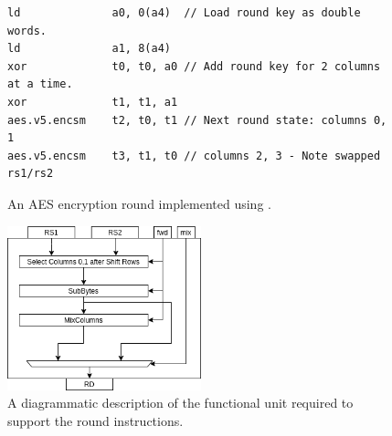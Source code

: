 \begin{figure}[!h]
\begin{lstlisting}[language=pseudo,style=block]
ld              a0, 0(a4)  // Load round key as double words.
ld              a1, 8(a4)
xor             t0, t0, a0 // Add round key for 2 columns at a time.
xor             t1, t1, a1
aes.v5.encsm    t2, t0, t1 // Next round state: columns 0, 1
aes.v5.encsm    t3, t1, t0 // columns 2, 3 - Note swapped rs1/rs2
\end{lstlisting}
\caption{
  An AES encryption round implemented using .
}
\label{fig:v4:round}
\end{figure}

\vspace*{\fill}


\newpage

\vspace*{\fill}

\begin{figure}[!h]
\centering
\includegraphics[width={0.5\textwidth}]{diagrams/ise-datapath-v4.png}
\caption{
  A diagrammatic description of the functional unit required to support the
   round instructions.
}
\label{fig:v4:fu}
\end{figure}

\vspace*{\fill}

